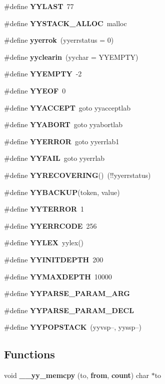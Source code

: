 \begin{CompactItemize}
\item 
\#define {\bf YYLAST}\ 77
\item 
\#define {\bf YYSTACK\_\-ALLOC}\ malloc
\item 
\#define {\bf yyerrok}\ (yyerrstatus = 0)
\item 
\#define {\bf yyclearin}\ (yychar = YYEMPTY)
\item 
\#define {\bf YYEMPTY}\ -2
\item 
\#define {\bf YYEOF}\ 0
\item 
\#define {\bf YYACCEPT}\ goto yyacceptlab
\item 
\#define {\bf YYABORT}\ goto yyabortlab
\item 
\#define {\bf YYERROR}\ goto yyerrlab1
\item 
\#define {\bf YYFAIL}\ goto yyerrlab
\item 
\#define {\bf YYRECOVERING}()\ (!!yyerrstatus)
\item 
\#define {\bf YYBACKUP}(token, value)
\item 
\#define {\bf YYTERROR}\ 1
\item 
\#define {\bf YYERRCODE}\ 256
\item 
\#define {\bf YYLEX}\ yylex()
\item 
\#define {\bf YYINITDEPTH}\ 200
\item 
\#define {\bf YYMAXDEPTH}\ 10000
\item 
\#define {\bf YYPARSE\_\-PARAM\_\-ARG}
\item 
\#define {\bf YYPARSE\_\-PARAM\_\-DECL}
\item 
\#define {\bf YYPOPSTACK}\ (yyvsp--, yyssp--)
\end{CompactItemize}
\subsection*{Functions}
\begin{CompactItemize}
\item 
void {\bf \_\-\_\-yy\_\-memcpy} (to, {\bf from}, {\bf count}) char $\ast$to
\end{CompactItemize}
